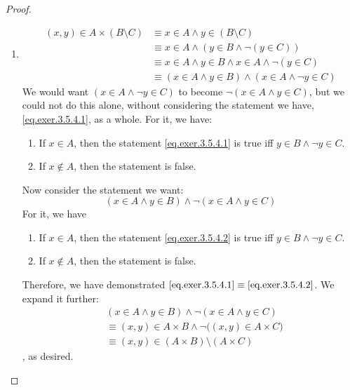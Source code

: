 \begin{proof}
\begin{enumerate}
		\item
		\begin{align}
			(x,y) \in A \times (B \setminus C) 
			&\equiv x \in A \wedge y \in (B \setminus C) \nonumber\\
			&\equiv x \in A \wedge (y \in B \wedge \neg (y \in C)) \nonumber\\
			&\equiv x \in A \wedge y \in B \wedge x \in A \wedge \neg (y \in C) \nonumber\\
			&\equiv (x \in A \wedge y \in B) \wedge (x \in A \wedge \neg y \in C) \label{eq.exer.3.5.4.1}
		\end{align}
		We would want $(x \in A \wedge \neg y \in C)$ to become $\neg (x \in A \wedge y \in C)$, but we could not do this alone, without considering the statement we have, \eqref{eq.exer.3.5.4.1}, as a whole. For it, we have:
		\begin{enumerate}
			\item If $x \in A$, then the statement \eqref{eq.exer.3.5.4.1} is true iff $y \in B \wedge \neg y \in C$.
			\item If $x \notin A$, then the statement is false.
		\end{enumerate}
		
		Now consider the statement we want:
		\begin{equation}
			(x \in A \wedge y \in B) \wedge \neg(x \in A \wedge y \in C) \label{eq.exer.3.5.4.2}
		\end{equation}
		For it, we have
		\begin{enumerate}
			\item If $x \in A$, then the statement \eqref{eq.exer.3.5.4.2} is true iff $y \in B \wedge \neg y \in C$.
			\item If $x \notin A$, then the statement is false.
		\end{enumerate}
	
		Therefore, we have demonstrated $\eqref{eq.exer.3.5.4.1} \equiv \eqref{eq.exer.3.5.4.2}$. We expand it further:
		\begin{align*}
			&(x \in A \wedge y \in B) \wedge \neg(x \in A \wedge y \in C) \\
			&\equiv (x,y) \in A \times B \wedge \neg\bigl((x,y) \in A \times C\bigr) \\
			&\equiv (x,y) \in (A \times B) \setminus (A \times C)
		\end{align*}
		, as desired.
	\end{enumerate}
\end{proof}

